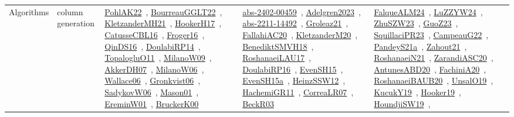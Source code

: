 {\begin{longtable}{lp{3cm}>{\raggedright\arraybackslash}p{6cm}>{\raggedright\arraybackslash}p{6cm}>{\raggedright\arraybackslash}p{8cm}}
Algorithms & column generation & \href{../works/PohlAK22.pdf}{PohlAK22}~\cite{PohlAK22}, \href{../works/BourreauGGLT22.pdf}{BourreauGGLT22}~\cite{BourreauGGLT22}, \href{../works/KletzanderMH21.pdf}{KletzanderMH21}~\cite{KletzanderMH21}, \href{../works/HookerH17.pdf}{HookerH17}~\cite{HookerH17}, \href{../works/CatusseCBL16.pdf}{CatusseCBL16}~\cite{CatusseCBL16}, \href{../works/Froger16.pdf}{Froger16}~\cite{Froger16}, \href{../works/QinDS16.pdf}{QinDS16}~\cite{QinDS16}, \href{../works/DoulabiRP14.pdf}{DoulabiRP14}~\cite{DoulabiRP14}, \href{../works/TopalogluO11.pdf}{TopalogluO11}~\cite{TopalogluO11}, \href{../works/MilanoW09.pdf}{MilanoW09}~\cite{MilanoW09}, \href{../works/AkkerDH07.pdf}{AkkerDH07}~\cite{AkkerDH07}, \href{../works/MilanoW06.pdf}{MilanoW06}~\cite{MilanoW06}, \href{../works/Wallace06.pdf}{Wallace06}~\cite{Wallace06}, \href{../works/Gronkvist06.pdf}{Gronkvist06}~\cite{Gronkvist06}, \href{../works/SadykovW06.pdf}{SadykovW06}~\cite{SadykovW06}, \href{../works/Mason01.pdf}{Mason01}~\cite{Mason01}, \href{../works/EreminW01.pdf}{EreminW01}~\cite{EreminW01}, \href{../works/BruckerK00.pdf}{BruckerK00}~\cite{BruckerK00} & \href{../works/abs-2402-00459.pdf}{abs-2402-00459}~\cite{abs-2402-00459}, \href{../works/Adelgren2023.pdf}{Adelgren2023}~\cite{Adelgren2023}, \href{../works/abs-2211-14492.pdf}{abs-2211-14492}~\cite{abs-2211-14492}, \href{../works/Groleaz21.pdf}{Groleaz21}~\cite{Groleaz21}, \href{../works/FallahiAC20.pdf}{FallahiAC20}~\cite{FallahiAC20}, \href{../works/KletzanderM20.pdf}{KletzanderM20}~\cite{KletzanderM20}, \href{../works/BenediktSMVH18.pdf}{BenediktSMVH18}~\cite{BenediktSMVH18}, \href{../works/RoshanaeiLAU17.pdf}{RoshanaeiLAU17}~\cite{RoshanaeiLAU17}, \href{../works/DoulabiRP16.pdf}{DoulabiRP16}~\cite{DoulabiRP16}, \href{../works/EvenSH15.pdf}{EvenSH15}~\cite{EvenSH15}, \href{../works/EvenSH15a.pdf}{EvenSH15a}~\cite{EvenSH15a}, \href{../works/HeinzSSW12.pdf}{HeinzSSW12}~\cite{HeinzSSW12}, \href{../works/HachemiGR11.pdf}{HachemiGR11}~\cite{HachemiGR11}, \href{../works/CorreaLR07.pdf}{CorreaLR07}~\cite{CorreaLR07}, \href{../works/BeckR03.pdf}{BeckR03}~\cite{BeckR03} & \href{../works/FalqueALM24.pdf}{FalqueALM24}~\cite{FalqueALM24}, \href{../works/LuZZYW24.pdf}{LuZZYW24}~\cite{LuZZYW24}, \href{../works/ZhuSZW23.pdf}{ZhuSZW23}~\cite{ZhuSZW23}, \href{../works/GuoZ23.pdf}{GuoZ23}~\cite{GuoZ23}, \href{../works/SquillaciPR23.pdf}{SquillaciPR23}~\cite{SquillaciPR23}, \href{../works/CampeauG22.pdf}{CampeauG22}~\cite{CampeauG22}, \href{../works/PandeyS21a.pdf}{PandeyS21a}~\cite{PandeyS21a}, \href{../works/Zahout21.pdf}{Zahout21}~\cite{Zahout21}, \href{../works/RoshanaeiN21.pdf}{RoshanaeiN21}~\cite{RoshanaeiN21}, \href{../works/ZarandiASC20.pdf}{ZarandiASC20}~\cite{ZarandiASC20}, \href{../works/AntunesABD20.pdf}{AntunesABD20}~\cite{AntunesABD20}, \href{../works/FachiniA20.pdf}{FachiniA20}~\cite{FachiniA20}, \href{../works/RoshanaeiBAUB20.pdf}{RoshanaeiBAUB20}~\cite{RoshanaeiBAUB20}, \href{../works/UnsalO19.pdf}{UnsalO19}~\cite{UnsalO19}, \href{../works/KucukY19.pdf}{KucukY19}~\cite{KucukY19}, \href{../works/Hooker19.pdf}{Hooker19}~\cite{Hooker19}, \href{../works/HoundjiSW19.pdf}{HoundjiSW19}~\cite{HoundjiSW19}, 
\end{longtable}}
